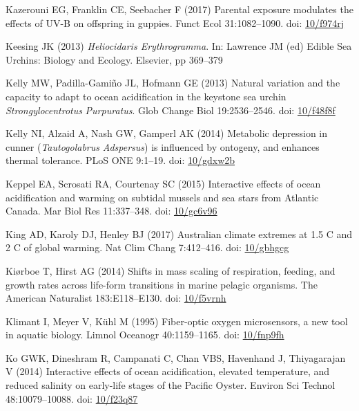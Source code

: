 \documentclass[a4paper,10pt, oneside]{memoir}
\begin{document}
\leavevmode\hypertarget{ref-Kazerouni2017}{}%
Kazerouni EG, Franklin CE, Seebacher F (2017) Parental exposure modulates the effects of UV-B on offspring in guppies. Funct Ecol 31:1082--1090. doi: \href{https://doi.org/10/f974rj}{10/f974rj}

\leavevmode\hypertarget{ref-Keesing2013}{}%
Keesing JK (2013) \emph{Heliocidaris Erythrogramma}. In: Lawrence JM (ed) Edible Sea Urchins: Biology and Ecology. Elsevier, pp 369--379

\leavevmode\hypertarget{ref-Kelly2013}{}%
Kelly MW, Padilla-Gamiño JL, Hofmann GE (2013) Natural variation and the capacity to adapt to ocean acidification in the keystone sea urchin \emph{Strongylocentrotus} \emph{Purpuratus}. Glob Change Biol 19:2536--2546. doi: \href{https://doi.org/10/f48f8f}{10/f48f8f}

\leavevmode\hypertarget{ref-Kelly2014}{}%
Kelly NI, Alzaid A, Nash GW, Gamperl AK (2014) Metabolic depression in cunner (\emph{Tautogolabrus} \emph{Adspersus}) is influenced by ontogeny, and enhances thermal tolerance. PLoS ONE 9:1--19. doi: \href{https://doi.org/10/gdxw2b}{10/gdxw2b}

\leavevmode\hypertarget{ref-Keppel2015}{}%
Keppel EA, Scrosati RA, Courtenay SC (2015) Interactive effects of ocean acidification and warming on subtidal mussels and sea stars from Atlantic Canada. Mar Biol Res 11:337--348. doi: \href{https://doi.org/10/gc6v96}{10/gc6v96}

\leavevmode\hypertarget{ref-King2017}{}%
King AD, Karoly DJ, Henley BJ (2017) Australian climate extremes at 1.5 C and 2 C of global warming. Nat Clim Chang 7:412--416. doi: \href{https://doi.org/10/gbhgcg}{10/gbhgcg}

\leavevmode\hypertarget{ref-Kiorboe2014}{}%
Kiørboe T, Hirst AG (2014) Shifts in mass scaling of respiration, feeding, and growth rates across life-form transitions in marine pelagic organisms. The American Naturalist 183:E118--E130. doi: \href{https://doi.org/10/f5vrnh}{10/f5vrnh}

\leavevmode\hypertarget{ref-Klimant1995}{}%
Klimant I, Meyer V, Kühl M (1995) Fiber-optic oxygen microsensors, a new tool in aquatic biology. Limnol Oceanogr 40:1159--1165. doi: \href{https://doi.org/10/fnp9fh}{10/fnp9fh}

\leavevmode\hypertarget{ref-Ko2014}{}%
Ko GWK, Dineshram R, Campanati C, Chan VBS, Havenhand J, Thiyagarajan V (2014) Interactive effects of ocean acidification, elevated temperature, and reduced salinity on early-life stages of the Pacific Oyster. Environ Sci Technol 48:10079--10088. doi: \href{https://doi.org/10/f23q87}{10/f23q87}
\end{document}
